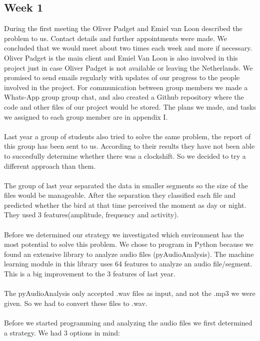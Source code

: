 \documentclass[a4paper]{article}
\begin{document}
\subsection*{Week 1}
During the first meeting  the Oliver Padget and Emiel van Loon described the problem to us. Contact details and further appointments were made. We concluded that we would meet about two times each week and more if necessary. Oliver Padget is the main client and Emiel Van Loon is also involved in this project just in case Oliver Padget is not available or leaving the Netherlands.  We promised to send emails regularly with updates of our progress to the people involved in the project. For communication between group members we made a Whats-App group group chat, and also created a Github repository where the code and other files of our project would be stored. The plans we made, and tasks we assigned to each group member are in appendix I.\\\\
Last year a group of students also tried to solve the same problem, the report of this group has been sent to us. According to their results they have not been able to succesfully determine whether there was a clockshift. So we decided to try a different approach than them.
\\\\
The group of last year separated the data in smaller segments so the size of the files would be manageable. After the separation they classified each file and predicted whether the bird at that time perceived the moment as day or night. They used 3 features(amplitude, frequency and activity).\\\\
Before we determined our strategy we investigated which environment has the most potential to solve this problem. We chose to program in Python because we found an extensive library to analyze audio files (pyAudioAnalysis). The machine learning module in this library uses 64 features to analyze an audio file/segment. This is a big improvement to the 3 features of last year.\\\\
The pyAudioAnalysis only accepted .wav files as input, and not the .mp3 we were given. So we had to convert these files to .wav.\\\\
Before we started programming and analyzing the audio files we first determined a strategy. We had 3 options in mind:\\\\
\end{document}
